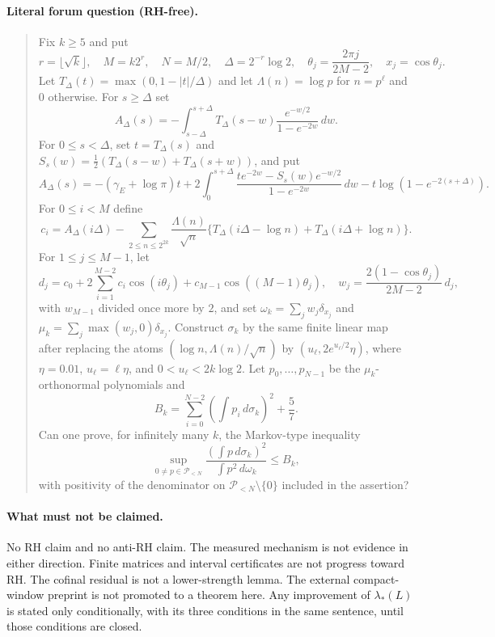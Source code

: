 \documentclass[11pt]{article}
\theoremstyle{remark}
\begin{document}
\paragraph{Literal forum question (RH-free).}
\begin{quote}\small
Fix $k\ge5$ and put
\[
r=\lfloor\sqrt k\rfloor,\quad M=k2^r,\quad N=M/2,\quad
\Delta=2^{-r}\log2,\quad
\theta_j=\frac{2\pi j}{2M-2},\quad x_j=\cos\theta_j .
\]
Let $T_\Delta(t)=\max(0,1-|t|/\Delta)$ and let
$\Lambda(n)=\log p$ for $n=p^\ell$ and $0$ otherwise.  For
$s\ge\Delta$ set
\[
A_\Delta(s)=-\int_{s-\Delta}^{s+\Delta}
T_\Delta(s-w)\frac{e^{-w/2}}{1-e^{-2w}}\,dw .
\]
For $0\le s<\Delta$, set $t=T_\Delta(s)$ and
$S_s(w)=\tfrac12(T_\Delta(s-w)+T_\Delta(s+w))$, and put
\[
A_\Delta(s)=-(\gamma_E+\log\pi)t+
2\int_0^{s+\Delta}
\frac{te^{-2w}-S_s(w)e^{-w/2}}{1-e^{-2w}}\,dw
-t\log(1-e^{-2(s+\Delta)}).
\]
For $0\le i<M$ define
\[
c_i=A_\Delta(i\Delta)-
\sum_{2\le n\le 2^{2k}}\frac{\Lambda(n)}{\sqrt n}
\{T_\Delta(i\Delta-\log n)+T_\Delta(i\Delta+\log n)\}.
\]
For $1\le j\le M-1$, let
\[
d_j=c_0+2\sum_{i=1}^{M-2}c_i\cos(i\theta_j)
+c_{M-1}\cos((M-1)\theta_j),
\quad
w_j=\frac{2(1-\cos\theta_j)}{2M-2}\,d_j,
\]
with $w_{M-1}$ divided once more by $2$, and set
$\omega_k=\sum_jw_j\delta_{x_j}$ and
$\mu_k=\sum_j\max(w_j,0)\delta_{x_j}$.
Construct $\sigma_k$ by the same finite linear map after replacing
the atoms $(\log n,\Lambda(n)/\sqrt n)$ by
$(u_\ell,2e^{u_\ell/2}\eta)$, where
$\eta=0.01$, $u_\ell=\ell\eta$, and $0<u_\ell<2k\log2$.
Let $p_0,\ldots,p_{N-1}$ be the $\mu_k$-orthonormal polynomials and
\[
B_k=\sum_{i=0}^{N-2}\left(\int p_i\,d\sigma_k\right)^2+\frac57.
\]
Can one prove, for infinitely many $k$, the Markov-type inequality
\[
\sup_{0\ne p\in\mathcal P_{<N}}
\frac{\left(\int p\,d\sigma_k\right)^2}
     {\int p^2\,d\omega_k}\le B_k,
\]
with positivity of the denominator on
$\mathcal P_{<N}\setminus\{0\}$ included in the assertion?
\end{quote}

\paragraph{What must not be claimed.}
No RH claim and no anti-RH claim.  The measured mechanism is not
evidence in either direction.  Finite matrices and interval
certificates are not progress toward RH.  The cofinal residual is
not a lower-strength lemma.  The external compact-window preprint is
not promoted to a theorem here.  Any improvement of
$\lambda_*(L)$ is stated only conditionally, with its three
conditions in the same sentence, until those conditions are closed.
\end{document}
